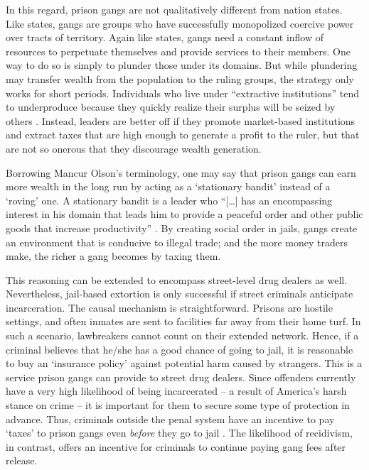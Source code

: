 \documentclass[a4paper, 12pt]{article}
\begin{document}
In this regard, prison gangs are not qualitatively different from nation states. Like states, gangs are groups who have successfully monopolized coercive power over tracts of territory. Again like states, gangs need a constant inflow of resources to perpetuate themselves and provide services to their members. One way to do so is simply to plunder those under its domains. But while plundering may transfer wealth from the population to the ruling groups, the strategy only works for short periods. Individuals who live under ``extractive institutions'' tend to underproduce because they quickly realize their surplus will be seized by others \citep{acemoglu2012nations}. Instead, leaders are better off if they promote market-based institutions and extract taxes that are high enough to generate a profit to the ruler, but that are not so onerous that they discourage wealth generation. 

Borrowing Mancur Olson's terminology, one may say that prison gangs can earn more wealth in the long run by acting as a `stationary bandit' instead of a `roving' one. A stationary bandit is a leader who ``[\dots] has an encompassing interest in his domain that leads him to provide a peaceful order and other public goods that increase productivity'' \citep[p. 567]{olson1993dictatorship}. By creating social order in jails, gangs create an environment that is conducive to illegal trade; and the more money traders make, the richer a gang becomes by taxing them.

This reasoning can be extended to encompass street-level drug dealers as well. Nevertheless, jail-based extortion is only successful if street criminals anticipate incarceration. The causal mechanism is straightforward. Prisons are hostile settings, and often inmates are sent to facilities far away from their home turf. In such a scenario, lawbreakers cannot count on their extended network. Hence, if a criminal believes that he/she has a good chance of going to jail, it is reasonable to buy an `insurance policy' against potential harm caused by strangers. This is a service prison gangs can provide to street drug dealers. Since offenders currently have a very high likelihood of being incarcerated -- a result of America's harsh stance on crime -- it is important for them to secure some type of protection in advance. Thus, criminals outside the penal system have an incentive to pay `taxes' to prison gangs even \textit{before} they go to jail \citep{skarbek2011governance,skarbek2014social}. The likelihood of recidivism, in contrast, offers an incentive for criminals to continue paying gang fees after release. 
\end{document}
